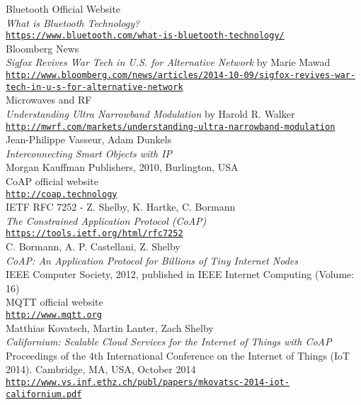 \begin{thebibliography}{}
 Bluetooth Official Website\\
  \emph{What is Bluetooth Technology?} \\
  \footnotesize \texttt{\url{https://www.bluetooth.com/what-is-bluetooth-technology/}} \\
  
 Bloomberg News \\
  \emph{Sigfox Revives War Tech in U.S. for Alternative Network} by Marie Mawad \\
  \footnotesize \texttt{\url{http://www.bloomberg.com/news/articles/2014-10-09/sigfox-revives-war-tech-in-u-s-for-alternative-network}} \\
  
 Microwaves and RF\\
  \emph{Understanding Ultra Narrowband Modulation} by Harold R. Walker \\
  \footnotesize \texttt{\url{http://mwrf.com/markets/understanding-ultra-narrowband-modulation}} \\
  
 Jean-Philippe Vasseur, Adam Dunkels\\
  \emph{Interconnecting Smart Objects with IP} \\
  \footnotesize Morgan Kauffman Publishers, 2010, Burlington, USA \\
  
 CoAP official website\\
  \footnotesize \texttt{\url{http://coap.technology}} \\
  
 IETF RFC 7252 - Z. Shelby, K. Hartke, C. Bormann\\
  \emph{The Constrained Application Protocol (CoAP)} \\
  \footnotesize \texttt{\url{https://tools.ietf.org/html/rfc7252}} \\
  
 C. Bormann, A. P. Castellani, Z. Shelby\\
  \emph{CoAP: An Application Protocol for Billions of Tiny Internet Nodes} \\
  \footnotesize IEEE Computer Society, 2012, published in IEEE Internet Computing (Volume: 16) \\
  
 MQTT official website\\
  \footnotesize \texttt{\url{http://www.mqtt.org}} \\
  
 Matthias Kovatsch, Martin Lanter, Zach Shelby\\
  \emph{Californium: Scalable Cloud Services for the Internet of Things with CoAP} \\
  \footnotesize Proceedings of the 4th International Conference on the Internet of Things (IoT 2014). Cambridge, MA, USA, October 2014 \\
  \texttt{\url{http://www.vs.inf.ethz.ch/publ/papers/mkovatsc-2014-iot-californium.pdf}}
  
\end{thebibliography}

